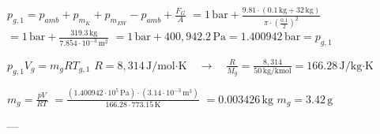 \( p_{g,1} = p_{amb} + p_{m_K} + p_{m_{EW}} - p_{amb} + \frac{F_G}{A} \)  
\( = 1 \, \text{bar} + \frac{9.81 \cdot (0.1 \, \text{kg} + 32 \, \text{kg})}{\pi \cdot \left(\frac{0.1}{2}\right)^2} \)  
\( = 1 \, \text{bar} + \frac{319.3 \, \text{kg}}{7.854 \cdot 10^{-3} \, \text{m}^2} \)  
\( = 1 \, \text{bar} + 400,942.2 \, \text{Pa} = 1.400942 \, \text{bar} = p_{g,1} \)  

\( p_{g,1} V_g = m_g R T_{g,1} \)  
\( R = 8,314 \, \text{J/mol·K} \quad \rightarrow \quad \frac{R}{M_g} = \frac{8,314}{50 \, \text{kg/kmol}} = 166.28 \, \text{J/kg·K} \)  

\( m_g = \frac{p V}{R T} \)  
\( = \frac{(1.400942 \cdot 10^5 \, \text{Pa}) \cdot (3.14 \cdot 10^{-3} \, \text{m}^3)}{166.28 \cdot 773.15 \, \text{K}} \)  
\( = 0.003426 \, \text{kg} \)  
\( m_g = 3.42 \, \text{g} \)  

---